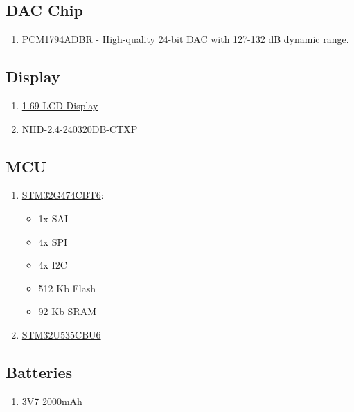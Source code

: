 \documentclass{article}
\begin{document}
\subsection{DAC Chip}
\begin{enumerate}
    \item \href{https://www.digikey.com.au/en/products/detail/texas-instruments/PCM1794ADBR/1426892}{PCM1794ADBR} - High-quality 24-bit DAC with 127-132 dB dynamic range.
\end{enumerate}

\subsection{Display}
\begin{enumerate}
    \item \href{https://core-electronics.com.au/169inch-lcd-display-module-spi-240x280.html}{1.69 LCD Display}
    \item \href{https://www.digikey.com.au/en/products/detail/newhaven-display-intl/NHD-2-4-240320DB-CTXP/26743730?s=N4IgTCBcDaIHIAkAiBaMA6ALGzAGAzGLkgEIoDCAKgBoAKIAugL5A}{NHD-2.4-240320DB-CTXP}
\end{enumerate}

\subsection{MCU}
\begin{enumerate}
    \item \href{https://www.digikey.com.au/en/products/detail/stmicroelectronics/STM32G474CBT6/12337551}{STM32G474CBT6}:
        \begin{itemize}
            \item 1x SAI
            \item 4x SPI
            \item 4x I2C
            \item 512 Kb Flash
            \item 92 Kb SRAM
        \end{itemize}
    \item \href{https://www.digikey.com.au/en/products/detail/stmicroelectronics/STM32U535CBU6/22106512}{STM32U535CBU6}
\end{enumerate}

\subsection{Batteries}
\begin{enumerate}
    \item \href{https://www.auselectronicsdirect.com.au/3.7v-2000mah-li-po-rechargeable-battery-with-jst-p}{3V7 2000mAh}
\end{enumerate}
\end{document}
